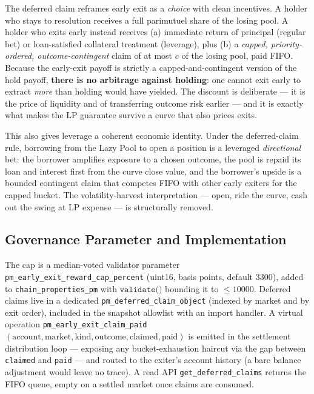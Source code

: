 \documentclass{ledger}
\theoremstyle{plain}
\theoremstyle{remark}
\begin{document}
The deferred claim reframes early exit as a \emph{choice} with clean incentives.
A holder who stays to resolution receives a full parimutuel share of the losing
pool. A holder who exits early instead receives (a) immediate return of
principal (regular bet) or loan-satisfied collateral treatment (leverage), plus
(b) a \emph{capped, priority-ordered, outcome-contingent} claim of at most $c$ of
the losing pool, paid FIFO. Because the early-exit payoff is strictly a
capped-and-contingent version of the hold payoff, \textbf{there is no arbitrage
against holding}: one cannot exit early to extract \emph{more} than holding would
have yielded. The discount is deliberate --- it is the price of liquidity and of
transferring outcome risk earlier --- and it is exactly what makes the LP
guarantee survive a curve that also prices exits.

This also gives leverage a coherent economic identity. Under the deferred-claim
rule, borrowing from the Lazy Pool to open a position is a leveraged
\emph{directional} bet: the borrower amplifies exposure to a chosen outcome, the
pool is repaid its loan and interest first from the curve close value, and the
borrower's upside is a bounded contingent claim that competes FIFO with other
early exiters for the capped bucket. The volatility-harvest interpretation ---
open, ride the curve, cash out the swing at LP expense --- is structurally
removed.

\subsection{Governance Parameter and Implementation}\label{sec:defimpl}

The cap is a median-voted validator parameter
\texttt{pm\_early\_exit\_reward\_cap\_percent} (uint16, basis points, default
$3300$), added to \texttt{chain\_properties\_pm} with $\texttt{validate()}$
bounding it to $\le 10000$. Deferred claims live in a dedicated
\texttt{pm\_deferred\_claim\_object} (indexed by market and by exit order),
included in the snapshot allowlist with an import handler. A virtual operation
\texttt{pm\_early\_exit\_claim\_paid}$(\text{account}, \text{market},
\text{kind}, \text{outcome}, \text{claimed}, \text{paid})$ is emitted in the
settlement distribution loop --- exposing any bucket-exhaustion haircut via the
gap between \texttt{claimed} and \texttt{paid} --- and routed to the exiter's
account history (a bare balance adjustment would leave no trace). A read API
\texttt{get\_deferred\_claims} returns the FIFO queue, empty on a settled market
once claims are consumed.
\end{document}
